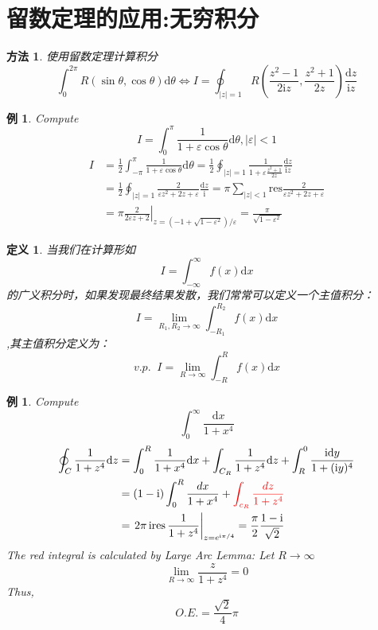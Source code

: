 \documentclass[10pt, a4paper, oneside]{ctexbook}
\newtheorem{definition}[theorem]{定义}
\newtheorem{example}[theorem]{例}
\newtheorem{method}[theorem]{方法}
\def\D{\mathrm{d}}
\begin{document}
\section{留数定理的应用:无穷积分}
\begin{method}
    使用留数定理计算积分
    $$
        \int_{0}^{2\pi} R(\sin \theta,\cos \theta) \D \theta \Leftrightarrow I=\oint_{|z|=1} R\left(\frac{z^{2}-1}{2 \mathrm{i} z}, \frac{z^{2}+1}{2 z}\right) \frac{\D z}{\mathrm{i} z}
    $$
\end{method}
\begin{example}
    Compute$$I=\int_{0}^{\pi} \frac{1}{1+\varepsilon \cos \theta} \D \theta,|\varepsilon|<1 $$
    \rm \begin{align*}
        I & =\frac{1}{2} \int_{-\pi}^{\pi} \frac{1}{1+\varepsilon \cos \theta} \D \theta=\frac{1}{2} \oint_{|z|=1} \frac{1}{1+\varepsilon \frac{z^{2}+1}{2 z}} \frac{\D z}{\mathrm{i} z} \\
          & =\frac{1}{2} \oint_{|z|=1} \frac{2}{\varepsilon z^{2}+2 z+\varepsilon} \frac{\D z}{\mathrm{i}}=\pi \sum_{|z|<1} \mathrm{res} \frac{2}{\varepsilon z^{2}+2 z+\varepsilon}     \\
          & =\left.\pi \frac{2}{2 \varepsilon z+2}\right|_{z=\left(-1+\sqrt{1-\varepsilon^{2}}\right) / \varepsilon}=\frac{\pi}{\sqrt{1-\varepsilon^{2}}}
    \end{align*}
\end{example}
\begin{definition}
    当我们在计算形如$$I=\int_{-\infty}^\infty f(x) \D x$$的广义积分时，如果发现最终结果发散，我们常常可以定义一个主值积分：
    $$I=\lim_{R_1,R_2\to \infty} \int_{-R_1}^{R_2} f(x) \D x$$,其主值积分定义为：
    $$v.p. \;\; I = \lim_{R\to \infty} \int_{-R}^R f(x) \D x$$
\end{definition}
\begin{example}
    Compute $$\int_0^\infty \frac{\D x}{1+x^4}$$\rm
    \begin{align*}
        \oint_{C} \frac{1}{1+z^{4}} \D z & =\int_{0}^{R} \frac{1}{1+x^{4}} \D x+\int_{C_{R}} \frac{1}{1+z^{4}} \D z+\int_{R}^{0} \frac{\mathrm{i} \D y}{1+(\mathrm{i} y)^{4}} \\
                                         & =(1-\mathrm{i}) \int_{0}^{R} \frac{d x}{1+x^{4}}+{\color{red} \int_{c_{R}} \frac{d z}{1+z^{4}}}                                    \\
                                         & =\left.2 \pi \operatorname{ires} \frac{1}{1+z^{4}}\right|_{z=e^{\mathrm{i} \pi / 4}}=\frac{\pi}{2} \frac{1-\mathrm{i}}{\sqrt{2}}
    \end{align*}
    The {\color{red}red integral} is calculated by Large Arc Lemma:
    Let $R \rightarrow \infty$
    $$
        \lim _{R \rightarrow \infty} \frac{z}{1+z^{4}}=0
    $$
    Thus,
    $$
        O.E.= \frac{\sqrt{2}}{4}\pi
    $$
\end{example}
\end{document}

